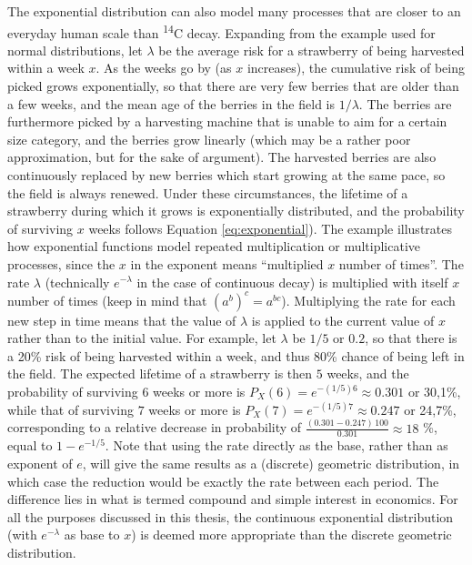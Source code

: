 \documentclass[
  12pt,
]{book}
\begin{document}
The exponential distribution can also model many processes that are closer to an everyday human scale than \textsuperscript{14}C decay. Expanding from the example used for normal distributions, let \(\lambda\) be the average risk for a strawberry of being harvested within a week \(x\). As the weeks go by (as \(x\) increases), the cumulative risk of being picked grows exponentially, so that there are very few berries that are older than a few weeks, and the mean age of the berries in the field is \(1/\lambda\). The berries are furthermore picked by a harvesting machine that is unable to aim for a certain size category, and the berries grow linearly (which may be a rather poor approximation, but for the sake of argument). The harvested berries are also continuously replaced by new berries which start growing at the same pace, so the field is always renewed. Under these circumstances, the lifetime of a strawberry during which it grows is exponentially distributed, and the probability of surviving \(x\) weeks follows Equation \eqref{eq:exponential}). The example illustrates how exponential functions model repeated multiplication or multiplicative processes, since the \(x\) in the exponent means ``multiplied \(x\) number of times''. The rate \(\lambda\) (technically \(e^{-\lambda}\) in the case of continuous decay) is multiplied with itself \(x\) number of times (keep in mind that \((a^b)^c = a^{bc}\)). Multiplying the rate for each new step in time means that the value of \(\lambda\) is applied to the current value of \(x\) rather than to the initial value. For example, let \(\lambda\) be \(1/5\) or \(0.2\), so that there is a 20\% risk of being harvested within a week, and thus 80\% chance of being left in the field. The expected lifetime of a strawberry is then \(5\) weeks, and the probability of surviving \(6\) weeks or more is \(P_X(6) = e^{-(1/5)6} \approx 0.301\) or 30,1\%, while that of surviving \(7\) weeks or more is \(P_X(7) = e^{-(1/5)7} \approx 0.247\) or 24,7\%, corresponding to a relative decrease in probability of \(\frac{(0.301-0.247)\,100}{0.301} \approx 18\) \%, equal to \(1-e^{-1/5}\). Note that using the rate directly as the base, rather than as exponent of \(e\), will give the same results as a (discrete) geometric distribution, in which case the reduction would be exactly the rate between each period. The difference lies in what is termed compound and simple interest in economics. For all the purposes discussed in this thesis, the continuous exponential distribution (with \(e^{-\lambda}\) as base to \(x\)) is deemed more appropriate than the discrete geometric distribution.
\end{document}
